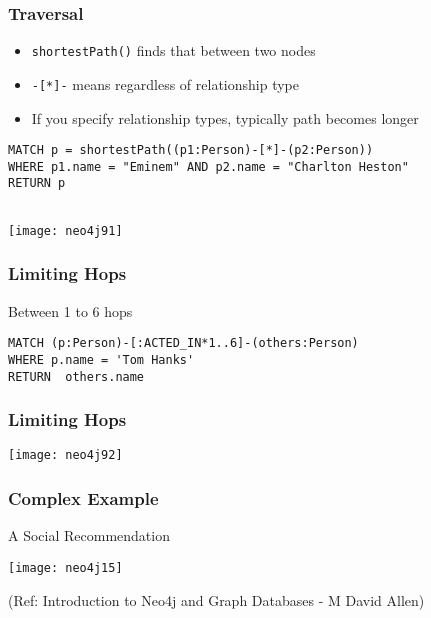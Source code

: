 \begin{frame}[fragile]\frametitle{Traversal}

\begin{itemize}
\item \lstinline|shortestPath()| finds that between two nodes
\item \lstinline|-[*]-| means regardless of relationship type
\item If you specify relationship types, typically path becomes longer
\end{itemize}


\begin{lstlisting}
MATCH p = shortestPath((p1:Person)-[*]-(p2:Person))
WHERE p1.name = "Eminem" AND p2.name = "Charlton Heston"
RETURN p


\end{lstlisting}

\begin{center}
\texttt{[image: neo4j91]}
\end{center}	  
\end{frame}


\begin{frame}[fragile]\frametitle{Limiting Hops}

Between 1 to 6 hops


\begin{lstlisting}
MATCH (p:Person)-[:ACTED_IN*1..6]-(others:Person)
WHERE p.name = 'Tom Hanks'
RETURN  others.name
\end{lstlisting}

 
\end{frame}



\begin{frame}[fragile]\frametitle{Limiting Hops}

\begin{center}
\texttt{[image: neo4j92]}
\end{center}	  
\end{frame}



\begin{frame}[fragile]\frametitle{Complex Example}
A Social Recommendation

\begin{center}
\texttt{[image: neo4j15]}
\end{center}	  


{\tiny (Ref: Introduction to Neo4j and Graph Databases
 - M David Allen)}

\end{frame}



